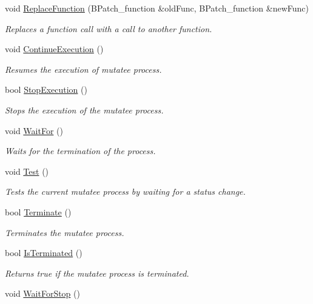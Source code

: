 \begin{DoxyCompactItemize}
void \hyperlink{class_di_process_a73bd02c4104451077f2622efd1c708d6}{Replace\-Function} (B\-Patch\-\_\-function \&old\-Func, B\-Patch\-\_\-function \&new\-Func)
\begin{DoxyCompactList}\small\item\em Replaces a function call with a call to another function. \end{DoxyCompactList}\item 
\hypertarget{class_di_process_a047096a8e3be003544529f1ddfa4d3c5}{void \hyperlink{class_di_process_a047096a8e3be003544529f1ddfa4d3c5}{Continue\-Execution} ()}\label{class_di_process_a047096a8e3be003544529f1ddfa4d3c5}

\begin{DoxyCompactList}\small\item\em Resumes the execution of mutatee process. \end{DoxyCompactList}\item 
bool \hyperlink{class_di_process_afa4a0216ebd254a2d353b79ac1c197fe}{Stop\-Execution} ()
\begin{DoxyCompactList}\small\item\em Stops the execution of the mutatee process. \end{DoxyCompactList}\item 
\hypertarget{class_di_process_a9acf14711e3036fe76342fd9405ea933}{void \hyperlink{class_di_process_a9acf14711e3036fe76342fd9405ea933}{Wait\-For} ()}\label{class_di_process_a9acf14711e3036fe76342fd9405ea933}

\begin{DoxyCompactList}\small\item\em Waits for the termination of the process. \end{DoxyCompactList}\item 
\hypertarget{class_di_process_a3a0f5ac09a216b99bd43b8ad85d3ec46}{void \hyperlink{class_di_process_a3a0f5ac09a216b99bd43b8ad85d3ec46}{Test} ()}\label{class_di_process_a3a0f5ac09a216b99bd43b8ad85d3ec46}

\begin{DoxyCompactList}\small\item\em Tests the current mutatee process by waiting for a status change. \end{DoxyCompactList}\item 
bool \hyperlink{class_di_process_ad70fc9c4feb2c10e1810ea7b988cb87f}{Terminate} ()
\begin{DoxyCompactList}\small\item\em Terminates the mutatee process. \end{DoxyCompactList}\item 
bool \hyperlink{class_di_process_a9dece6fa09fa876026e6f0d989dd2b31}{Is\-Terminated} ()
\begin{DoxyCompactList}\small\item\em Returns true if the mutatee process is terminated. \end{DoxyCompactList}\item 
\hypertarget{class_di_process_a55905bd1802af67249338f65deec5b9d}{void \hyperlink{class_di_process_a55905bd1802af67249338f65deec5b9d}{Wait\-For\-Stop} ()}\label{class_di_process_a55905bd1802af67249338f65deec5b9d}


\end{DoxyCompactItemize}
